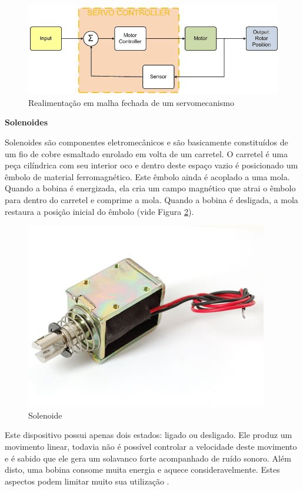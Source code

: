 \begin{anexosenv}
\begin{figure}[htb]
		\centering
			\includegraphics[scale=0.6]{figuras/closedloop.png}
		\caption{Realimentação em malha fechada de um servomecanismo}
		\label{closedloop}
\end{figure}





\textbf{Solenoides}

Solenoides são componentes eletromecânicos e são basicamente constituídos de um fio de cobre esmaltado enrolado em volta de um carretel. O carretel é uma peça cilíndrica com seu interior oco e dentro deste espaço vazio é posicionado um êmbolo de material ferromagnético. Este êmbolo ainda é acoplado a uma mola. Quando a bobina é energizada, ela cria um campo magnético que atrai o êmbolo para dentro do carretel e comprime a mola. Quando a bobina é desligada, a mola restaura a posição inicial do êmbolo (vide Figura \ref{solenoide}).

\begin{figure}[htb]
		\centering
			\includegraphics[scale=0.6]{figuras/solenoide.png}
		\caption{Solenoide}
		\label{solenoide}
\end{figure}

Este dispositivo possui apenas dois estados: ligado ou desligado. Ele produz um movimento linear, todavia não é possível controlar a velocidade deste movimento e é sabido que ele gera um solavanco forte acompanhado de ruído sonoro. Além disto, uma bobina consome muita energia e aquece consideravelmente. Estes aspectos podem limitar muito sua utilização \cite{machado}.





\end{anexosenv}
